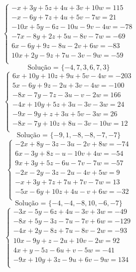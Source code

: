 \documentclass[12pt,oneside,a4paper]{article}
\begin{document}
\vspace{\baselineskip}
\begin{equation*}
\begin{cases}
-x+3y+5z+4u+3v+10w=115 \\
-x-6y+7z+4u+5v-7w=21 \\
-10x+5y-6z-10u-9v-4w=-78 \\
-7x-8y+2z+5u-8v-7w=-69 \\
6x-6y+9z-8u-2v+6w=-83 \\
10x+2y-9z+7u-3v-9w=-59 \\
\end{cases}
\end{equation*}
\begin{equation*}
\text{Solução = }\{-4,7,3,6,7,3\}
\end{equation*}
\vspace{\baselineskip}
\begin{equation*}
\begin{cases}
6x+10y+10z+9u+5v-4w=-203 \\
5x-6y+9z-2u+3v-4w=-100 \\
-8x-7y-7z-3u-v-2w=166 \\
-4x+10y+5z+3u-3v-3w=24 \\
-9x-9y+z+3u+5v-3w=26 \\
-8x-7y+10z+8u-3v-10w=12 \\
\end{cases}
\end{equation*}
\begin{equation*}
\text{Solução = }\{-9,1,-8,-8,-7,-7\}
\end{equation*}
\vspace{\baselineskip}
\begin{equation*}
\begin{cases}
-2x+8y-3z-3u-2v+8w=-74 \\
6x-3y+8z-u-10v+4w=-54 \\
9x+3y+5z-6u-7v-7w=-57 \\
-2x-2y-3z-2u-4v+5w=9 \\
-x+3y+7z+7u+7v-7w=13 \\
-5x-6y+10z+4u-v+6w=-32 \\
\end{cases}
\end{equation*}
\begin{equation*}
\text{Solução = }\{-4,-4,-8,10,-6,-7\}
\end{equation*}
\vspace{\baselineskip}
\begin{equation*}
\begin{cases}
-3x-5y-6z+4u-3v+3w=-49 \\
-8x+5y-3z-7u-7v+6w=-129 \\
-4x+2y-8z+7u-8v-2w=-93 \\
10x-9y+z-2u+10v-2w=92 \\
4x+y-5z-6u+v-5w=-41 \\
-9x+10y+3z-9u+6v-9w=134 \\
\end{cases}
\end{equation*}
\end{document}
